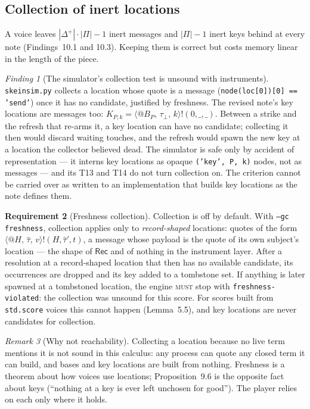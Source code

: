 \documentclass[11pt,a4paper]{article}
\makeatletter
\theoremstyle{definition}
\newtheorem{requirement}{Requirement}[section]
\theoremstyle{remark}
\newtheorem{remark}[requirement]{Remark}
\newtheorem{finding}[requirement]{Finding}
\newcommand{\Pit}{\Pi}
\newcommand{\Dur}{\Delta}
\newcommand{\nm}[3]{\langle @#1,\,#2,\,#3\rangle}
\newcommand{\MUST}{\textsc{must}}
\newcommand{\wild}{\_}
\newcommand{\Rec}{\mathsf{Rec}}
\makeatother
\begin{document}
\subsection{Collection of inert locations}

A voice leaves $|\Dur^+|\cdot|\Pit|-1$ inert messages and $|\Pit|-1$ inert keys
behind at every note (Findings~10.1 and 10.3). Keeping them is correct but
costs memory linear in the length of the piece.

\begin{finding}[The simulator's collection test is unsound with instruments]\label{find:gc}
\texttt{skeinsim.py} collects a location whose quote is a message
(\texttt{node(loc[0])[0] == 'send'}) once it has no candidate, justified by
freshness. The revised note's key locations are messages too:
$K_{P,k} = \nm{B_P}{\tau_\bot}{k}!(0,\wild,\wild)$. Between a strike and the
refresh that re-arms it, a key location can have no candidate; collecting it
then would discard waiting touches, and the refresh would spawn the new key at a
location the collector believed dead. The simulator is safe only by accident of
representation --- it interns key locations as opaque \texttt{('key', P, k)}
nodes, not as messages --- and its T13 and T14 do not turn collection on. The
criterion cannot be carried over as written to an implementation that builds
key locations as the note defines them.
\end{finding}

\begin{requirement}[Freshness collection]\label{req:gc}
Collection is off by default. With \texttt{--gc freshness}, collection applies
only to \emph{record-shaped} locations: quotes of the form
$\nm{H}{\hat\tau}{v}!(H,\hat\tau',t)$, a message whose payload is the quote of
its own subject's location --- the shape of $\Rec$ and of nothing in the
instrument layer. After a resolution at a record-shaped location that then has
no available candidate, its occurrences are dropped and its key added to a
tombstone set. If anything is later spawned at a tombstoned location, the engine
\MUST{} stop with \texttt{freshness-violated}: the collection was unsound for
this score. For scores built from \texttt{std.score} voices this cannot happen
(Lemma~5.5), and key locations are never candidates for collection.
\end{requirement}

\begin{remark}[Why not reachability]
Collecting a location because no live term mentions it is not sound in this
calculus: any process can quote any closed term it can build, and bases and key
locations are built from nothing. Freshness is a theorem about how voices use
locations; Proposition~9.6 is the opposite fact about keys (``nothing at a key is
ever left unchosen for good''). The player relies on each only where it holds.
\end{remark}
\end{document}
